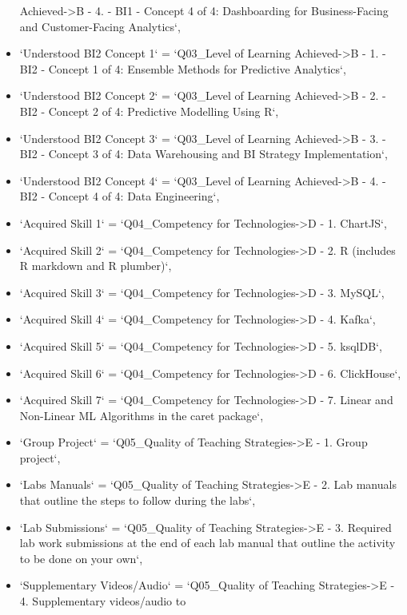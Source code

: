 \documentclass[
]{article}
\begin{document}
\begin{itemize}
  Achieved-\textgreater B - 4. - BI1 - Concept 4 of 4: Dashboarding for
  Business-Facing and Customer-Facing Analytics`,
\item
  `Understood BI2 Concept 1` = `Q03\_Level of Learning
  Achieved-\textgreater B - 1. - BI2 - Concept 1 of 4: Ensemble Methods
  for Predictive Analytics`,
\item
  `Understood BI2 Concept 2` = `Q03\_Level of Learning
  Achieved-\textgreater B - 2. - BI2 - Concept 2 of 4: Predictive
  Modelling Using R`,
\item
  `Understood BI2 Concept 3` = `Q03\_Level of Learning
  Achieved-\textgreater B - 3. - BI2 - Concept 3 of 4: Data Warehousing
  and BI Strategy Implementation`,
\item
  `Understood BI2 Concept 4` = `Q03\_Level of Learning
  Achieved-\textgreater B - 4. - BI2 - Concept 4 of 4: Data
  Engineering`,
\item
  `Acquired Skill 1` = `Q04\_Competency for Technologies-\textgreater D
  - 1. ChartJS`,
\item
  `Acquired Skill 2` = `Q04\_Competency for Technologies-\textgreater D
  - 2. R (includes R markdown and R plumber)`,
\item
  `Acquired Skill 3` = `Q04\_Competency for Technologies-\textgreater D
  - 3. MySQL`,
\item
  `Acquired Skill 4` = `Q04\_Competency for Technologies-\textgreater D
  - 4. Kafka`,
\item
  `Acquired Skill 5` = `Q04\_Competency for Technologies-\textgreater D
  - 5. ksqlDB`,
\item
  `Acquired Skill 6` = `Q04\_Competency for Technologies-\textgreater D
  - 6. ClickHouse`,
\item
  `Acquired Skill 7` = `Q04\_Competency for Technologies-\textgreater D
  - 7. Linear and Non-Linear ML Algorithms in the caret package`,
\item
  `Group Project` = `Q05\_Quality of Teaching Strategies-\textgreater E
  - 1. Group project`,
\item
  `Labs Manuals` = `Q05\_Quality of Teaching Strategies-\textgreater E -
  2. Lab manuals that outline the steps to follow during the labs`,
\item
  `Lab Submissions` = `Q05\_Quality of Teaching
  Strategies-\textgreater E - 3. Required lab work submissions at the
  end of each lab manual that outline the activity to be done on your
  own`,
\item
  `Supplementary Videos/Audio` = `Q05\_Quality of Teaching
  Strategies-\textgreater E - 4. Supplementary videos/audio to

\end{itemize}
\end{document}
